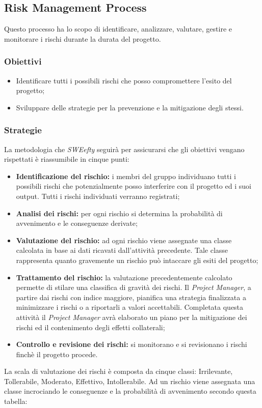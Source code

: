 	\subsection{Risk Management Process}
Questo processo ha lo scopo di identificare, analizzare, valutare, gestire e monitorare i rischi durante la durata del progetto.
\subsubsection{Obiettivi}
\begin{itemize}
	\item Identificare tutti i possibili rischi che posso compromettere l'esito del progetto;
	\item Sviluppare delle strategie per la prevenzione e la mitigazione degli stessi.
\end{itemize}
\subsubsection{Strategie}
La metodologia che \textit{SWEefty} seguirà per assicurarsi che gli obiettivi vengano rispettati è riassumibile in cinque punti:
\begin{itemize}
	\item \textbf{Identificazione del rischio:} i membri del gruppo individuano tutti i possibili rischi che potenzialmente posso interferire con il progetto ed i suoi output. Tutti i rischi individuati verranno registrati;

	\item \textbf{Analisi dei rischi:} per ogni rischio si determina la probabilità di avvenimento e le conseguenze derivate;

	\item \textbf{Valutazione del rischio:} ad ogni rischio viene assegnate una classe calcolata in base ai dati ricavati dall'attività precedente. Tale classe rappresenta quanto gravemente un rischio può intaccare gli esiti del progetto;

	\item \textbf{Trattamento del rischio:} la valutazione precedentemente calcolato permette di stilare una classifica di gravità dei rischi. Il \emph{Project Manager}, a partire dai rischi con indice maggiore, pianifica una strategia finalizzata a minimizzare i rischi o a riportarli a valori accettabili. Completata questa attività il \emph{Project Manager} avrà elaborato un piano per la mitigazione dei rischi ed il contenimento degli effetti collaterali;

	\item \textbf{Controllo e revisione dei rischi:} si monitorano e si revisionano i rischi finchè il progetto procede.

\end{itemize}
	La scala di valutazione dei rischi è composta da cinque classi: Irrilevante, Tollerabile, Moderato, Effettivo, Intollerabile. Ad un rischio viene assegnata una classe incrociando le conseguenze e la probabilità di avvenimento secondo questa tabella:
	
